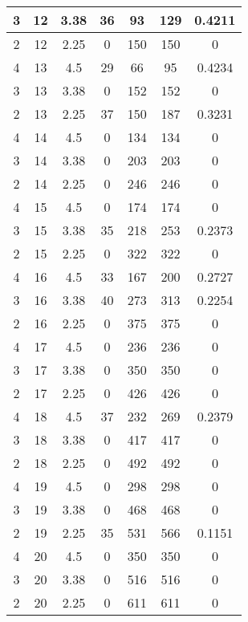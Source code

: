 \documentclass[letterpaper, 12pt]{article}
\begin{document}
\begin{longtable}{|c|c|c|c|c|c|c|}
\hline
3 & 12 & 3.38 & 36 & 93 & 129 & 0.4211 \\
\hline
2 & 12 & 2.25 & 0 & 150 & 150 & 0 \\
\hline
4 & 13 & 4.5 & 29 & 66 & 95 & 0.4234 \\
\hline
3 & 13 & 3.38 & 0 & 152 & 152 & 0 \\
\hline
2 & 13 & 2.25 & 37 & 150 & 187 & 0.3231 \\
\hline
4 & 14 & 4.5 & 0 & 134 & 134 & 0 \\
\hline
3 & 14 & 3.38 & 0 & 203 & 203 & 0 \\
\hline
2 & 14 & 2.25 & 0 & 246 & 246 & 0 \\
\hline
4 & 15 & 4.5 & 0 & 174 & 174 & 0 \\
\hline
3 & 15 & 3.38 & 35 & 218 & 253 & 0.2373 \\
\hline
2 & 15 & 2.25 & 0 & 322 & 322 & 0 \\
\hline
4 & 16 & 4.5 & 33 & 167 & 200 & 0.2727 \\
\hline
3 & 16 & 3.38 & 40 & 273 & 313 & 0.2254 \\
\hline
2 & 16 & 2.25 & 0 & 375 & 375 & 0 \\
\hline
4 & 17 & 4.5 & 0 & 236 & 236 & 0 \\
\hline
3 & 17 & 3.38 & 0 & 350 & 350 & 0 \\
\hline
2 & 17 & 2.25 & 0 & 426 & 426 & 0 \\
\hline
4 & 18 & 4.5 & 37 & 232 & 269 & 0.2379 \\
\hline
3 & 18 & 3.38 & 0 & 417 & 417 & 0 \\
\hline
2 & 18 & 2.25 & 0 & 492 & 492 & 0 \\
\hline
4 & 19 & 4.5 & 0 & 298 & 298 & 0 \\
\hline
3 & 19 & 3.38 & 0 & 468 & 468 & 0 \\
\hline
2 & 19 & 2.25 & 35 & 531 & 566 & 0.1151 \\
\hline
4 & 20 & 4.5 & 0 & 350 & 350 & 0 \\
\hline
3 & 20 & 3.38 & 0 & 516 & 516 & 0 \\
\hline
2 & 20 & 2.25 & 0 & 611 & 611 & 0 \\
\hline
\end{longtable}
\end{document}
